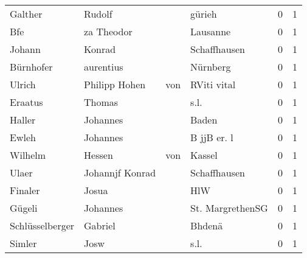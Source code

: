 \begin{center}
\begin{tiny}
\begin{longtabu}{llllrr}
                  Galther &                             Rudolf &             &                                      gürieh &          0 &         1 \\
                      Bfe &                         za Theodor &             &                                    Lausanne &          0 &         1 \\
                   Johann &                             Konrad &             &                                Schaffhausen &          0 &         1 \\
                Bürnhofer &                          aurentius &             &                                    Nürnberg &          0 &         1 \\
                   Ulrich &                     Philipp  Hohen &         von &                                 RViti vital &          0 &         1 \\
                  Eraatus &                             Thomas &             &                                        s.l. &          0 &         1 \\
                   Haller &                           Johannes &             &                                       Baden &          0 &         1 \\
                    Ewleh &                           Johannes &             &                                 B jjB er. l &          0 &         1 \\
                  Wilhelm &                             Hessen &         von &                                      Kassel &          0 &         1 \\
                    Ulaer &                    Johannjf Konrad &             &                                Schaffhausen &          0 &         1 \\
                  Finaler &                              Josua &             &                                         HlW &          0 &         1 \\
                   Gügeli &                           Johannes &             &                            St. MargrethenSG &          0 &         1 \\
          Schlüsselberger &                            Gabriel &             &                                      Bhdenä &          0 &         1 \\
                   Simler &                               Josw &             &                                        s.l. &          0 &         1 \\

\end{longtabu}
\end{tiny}
\end{center}
